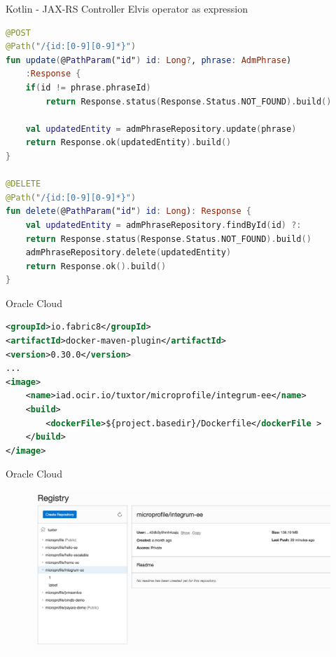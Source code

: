 \documentclass[aspectratio=169]{beamer}
\begin{document}
\begin{frame}[fragile]{Kotlin - JAX-RS Controller}
Elvis operator as expression
\begin{lstlisting}[language=Kotlin, basicstyle=\scriptsize\ttfamily]
@POST
@Path("/{id:[0-9][0-9]*}")
fun update(@PathParam("id") id: Long?, phrase: AdmPhrase)
    :Response {
    if(id != phrase.phraseId) 
        return Response.status(Response.Status.NOT_FOUND).build()
    
    val updatedEntity = admPhraseRepository.update(phrase)
    return Response.ok(updatedEntity).build()
}

@DELETE
@Path("/{id:[0-9][0-9]*}")
fun delete(@PathParam("id") id: Long): Response {
    val updatedEntity = admPhraseRepository.findById(id) ?:
    return Response.status(Response.Status.NOT_FOUND).build()
    admPhraseRepository.delete(updatedEntity)
    return Response.ok().build()
}
\end{lstlisting}

\end{frame}

\begin{frame}[fragile]{Oracle Cloud}
\begin{lstlisting}[language=XML, basicstyle=\scriptsize\ttfamily]
<groupId>io.fabric8</groupId>
<artifactId>docker-maven-plugin</artifactId>
<version>0.30.0</version>
...
<image>
    <name>iad.ocir.io/tuxtor/microprofile/integrum-ee</name>
    <build>
        <dockerFile>${project.basedir}/Dockerfile</dockerFile >
    </build>
</image>
\end{lstlisting}
\end{frame}

\begin{frame}{Oracle Cloud}
\begin{figure}
	\centering
	\includegraphics[width=0.95\linewidth]{Images/oc1}
\end{figure}
\end{frame}
\end{document}
